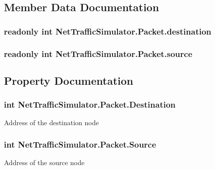\subsection{Member Data Documentation}
\hypertarget{classNetTrafficSimulator_1_1Packet_abb858df4db6996ea17200fb0369a7b2c}{
\subsubsection[{destination}]{\setlength{\rightskip}{0pt plus 5cm}readonly int Net\-Traffic\-Simulator.\-Packet.\-destination\hspace{0.3cm}{\ttfamily [private]}}}\label{classNetTrafficSimulator_1_1Packet_abb858df4db6996ea17200fb0369a7b2c}
\hypertarget{classNetTrafficSimulator_1_1Packet_a14e22dc3d532950074fe557df6b05324}{
\subsubsection[{source}]{\setlength{\rightskip}{0pt plus 5cm}readonly int Net\-Traffic\-Simulator.\-Packet.\-source\hspace{0.3cm}{\ttfamily [private]}}}\label{classNetTrafficSimulator_1_1Packet_a14e22dc3d532950074fe557df6b05324}


\subsection{Property Documentation}
\hypertarget{classNetTrafficSimulator_1_1Packet_a4b9f5194a86e8ede7235533e5562f3cc}{
\subsubsection[{Destination}]{\setlength{\rightskip}{0pt plus 5cm}int Net\-Traffic\-Simulator.\-Packet.\-Destination\hspace{0.3cm}{\ttfamily [get]}}}\label{classNetTrafficSimulator_1_1Packet_a4b9f5194a86e8ede7235533e5562f3cc}
Address of the destination node \hypertarget{classNetTrafficSimulator_1_1Packet_aa1bbb33d4ac2bab95590f51831d9cff8}{
\subsubsection[{Source}]{\setlength{\rightskip}{0pt plus 5cm}int Net\-Traffic\-Simulator.\-Packet.\-Source\hspace{0.3cm}{\ttfamily [get]}}}\label{classNetTrafficSimulator_1_1Packet_aa1bbb33d4ac2bab95590f51831d9cff8}
Address of the source node 

